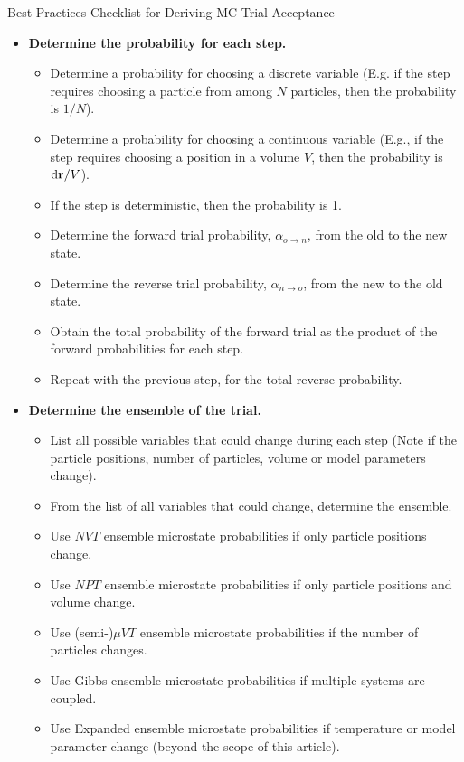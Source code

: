 \begin{Checklists*}[p!]
\begin{checklist}{Best Practices Checklist for Deriving MC Trial Acceptance}
\begin{itemize}
\item
  \textbf{Determine the probability for each step.}
  \begin{itemize}
    \item Determine a probability for choosing a discrete variable (E.g. if the step requires choosing a particle from among $N$ particles, then the probability is $1/N$).
    \item Determine a probability for choosing a continuous variable (E.g., if the step requires choosing a position in a volume $V$, then the probability is $\mathop{}\!\mathrm{d}\mathbf{r}/V$).
    \item If the step is deterministic, then the probability is 1.
    \item Determine the forward trial probability, $\alpha_{o \rightarrow n}$, from the old to the new state.
    \item Determine the reverse trial probability, $\alpha_{n \rightarrow o}$, from the new to the old state.
    \item Obtain the total probability of the forward trial as the product of the forward probabilities for each step.
    \item Repeat with the previous step, for the total reverse probability.
  \end{itemize}

\item
  \textbf{Determine the ensemble of the trial.}
  \begin{itemize}
    \item List all possible variables that could change during each step (Note if the particle positions, number of particles, volume or model parameters change).
    \item From the list of all variables that could change, determine the ensemble.
    \item Use $NVT$ ensemble microstate probabilities if only particle positions change.
    \item Use $NPT$ ensemble microstate probabilities if only particle positions and volume change.
    \item Use (semi-)$\mu VT$ ensemble microstate probabilities if the number of particles changes.
    \item Use Gibbs ensemble microstate probabilities if multiple systems are coupled.
    \item Use Expanded ensemble microstate probabilities if temperature or model parameter change (beyond the scope of this article).
  \end{itemize}


\end{itemize}
\end{checklist}
\end{Checklists*}
